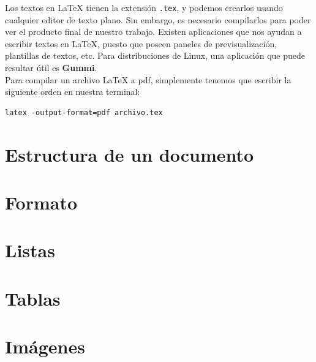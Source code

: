 \documentclass[11pt,twoside,titlepage,a4paper]{article}
\theoremstyle{ejemplo}
\theoremstyle{nota}
\newcommand{\lx}{LaTeX }
\begin{document}
Los textos en \lx tienen la extensión \texttt{.tex}, y podemos crearlos 
usando cualquier editor de texto plano. Sin embargo, es necesario 
compilarlos para poder ver el producto final de nuestro trabajo. Existen 
aplicaciones que nos ayudan a escribir textos en LaTeX, puesto que poseen
paneles de previsualización, plantillas de textos, etc. Para distribuciones de
Linux, una aplicación que puede resultar útil es \textbf{Gummi}.
\\

Para compilar un archivo \lx a pdf, simplemente tenemos que escribir la 
siguiente orden en nuestra terminal:
\begin{lstlisting}
latex -output-format=pdf archivo.tex
\end{lstlisting}


\newpage
\section{Estructura de un documento}


\newpage
\section{Formato}


\newpage
\section{Listas}


\newpage
\section{Tablas}


\newpage
\section{Imágenes}
\end{document}
